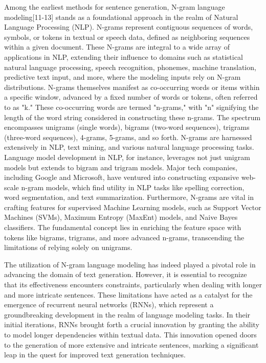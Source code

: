 \documentclass[conference]{IEEEtran}
\begin{document}
Among the earliest methods for sentence generation, N-gram language modeling[11-13] stands as a foundational approach in the realm of Natural Language Processing (NLP). N-grams represent contiguous sequences of words, symbols, or tokens in textual or speech data, defined as neighboring sequences within a given document. These N-grams are integral to a wide array of applications in NLP, extending their influence to domains such as statistical natural language processing, speech recognition, phonemes, machine translation, predictive text input, and more, where the modeling inputs rely on N-gram distributions. N-grams themselves manifest as co-occurring words or items within a specific window, advanced by a fixed number of words or tokens, often referred to as "k." These co-occurring words are termed "n-grams," with "n" signifying the length of the word string considered in constructing these n-grams. The spectrum encompasses unigrams (single words), bigrams (two-word sequences), trigrams (three-word sequences), 4-grams, 5-grams, and so forth. N-grams are harnessed extensively in NLP, text mining, and various natural language processing tasks. Language model development in NLP, for instance, leverages not just unigram models but extends to bigram and trigram models. Major tech companies, including Google and Microsoft, have ventured into constructing expansive web-scale n-gram models, which find utility in NLP tasks like spelling correction, word segmentation, and text summarization. Furthermore, N-grams are vital in crafting features for supervised Machine Learning models, such as Support Vector Machines (SVMs), Maximum Entropy (MaxEnt) models, and Naive Bayes classifiers. The fundamental concept lies in enriching the feature space with tokens like bigrams, trigrams, and more advanced n-grams, transcending the limitations of relying solely on unigrams.




The utilization of N-gram language modeling has indeed played a pivotal role in advancing the domain of text generation. However, it is essential to recognize that its effectiveness encounters constraints, particularly when dealing with longer and more intricate sentences. These limitations have acted as a catalyst for the emergence of recurrent neural networks (RNNs), which represent a groundbreaking development in the realm of language modeling tasks. In their initial iterations, RNNs brought forth a crucial innovation by granting the ability to model longer dependencies within textual data. This innovation opened doors to the generation of more extensive and intricate sentences, marking a significant leap in the quest for improved text generation techniques.
\end{document}
